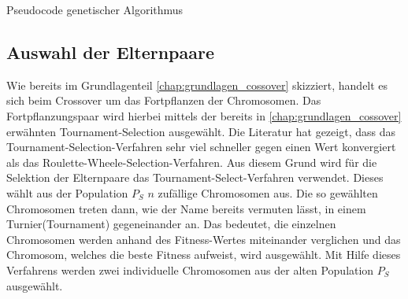 \begin{algorithm}[H]
	\begin{algorithmic}[1]
%		
		
		 				
		 
	 	\ENDFOR
		\ENDFOR
		\ELSE
		\ENDIF
	\ENDWHILE
	\caption{Pseudocode genetischer Algorithmus}
	\label{code:pseudocode_genetic_algo}
\end{algorithmic}
\end{algorithm}

\subsection{Auswahl der Elternpaare}

Wie bereits im Grundlagenteil \ref{chap:grundlagen_cossover} skizziert, handelt es sich beim Crossover um das Fortpflanzen der Chromosomen.
Das Fortpflanzungspaar wird hierbei mittels der bereits in \ref{chap:grundlagen_cossover} erwähnten Tournament-Selection ausgewählt. Die Literatur \cite{zhong2005comparison} hat gezeigt, dass das Tournament-Selection-Verfahren sehr viel schneller gegen einen Wert konvergiert als das Roulette-Wheele-Selection-Verfahren. Aus diesem Grund wird für die Selektion der Elternpaare das Tournament-Select-Verfahren verwendet. Dieses wählt aus der Population $P_S$ $n$ zufällige Chromosomen aus. Die so gewählten Chromosomen treten dann, wie der Name bereits vermuten lässt, in einem \glqq Turnier\grqq{ }(Tournament) gegeneinander an. Das bedeutet, die einzelnen Chromosomen werden anhand des Fitness-Wertes miteinander verglichen und das Chromosom, welches die beste Fitness aufweist, wird ausgewählt. Mit Hilfe dieses Verfahrens werden zwei individuelle Chromosomen aus der alten Population $P_S$ ausgewählt.
 
